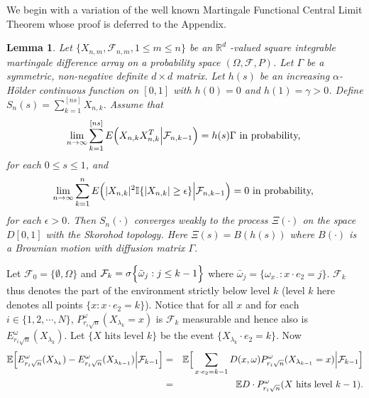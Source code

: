 \documentclass[11pt]{amsart}
\newtheorem{lemma}[theorem]{\sc Lemma}
\begin{document}
We begin with a variation of the well known Martingale Functional Central Limit Theorem whose proof is deferred to the Appendix.
\bigskip
\begin{lemma}
 \label{MCLT}
 Let $ \{X_{n,m}, \mathcal{F}_{n,m}, 1 \leq m \leq n \}$ be an $\mathbb{R}^d$ -valued square integrable martingale difference array on a probability space $(\Omega, \mathcal{F} , P )$. Let $\Gamma$ be a symmetric, non-negative definite $d \times d$ matrix. 
Let $h(s)$ be an increasing $\alpha$-H\"older continuous function on $[0,1]$ with $h(0)=0$ and $h(1)=\gamma >0$.
Define $S_n(s)= \sum_{k=1}^{[ns]}X_{n,k} $. 
Assume that
\begin{eqnarray}
\label{cond1}
\lim \limits_{n \to \infty} \sum_{k=1} ^ {[ns]} E\Big{(}X_{n,k} X_{n,k}^T \Big{\vert} \mathcal{F}_{n,k-1}\Big{)} =   h(s) \Gamma \mbox{   in probability,  } 
\end{eqnarray}
for each $0 \leq s \leq 1$, and 
\begin{eqnarray}
\label{cond2}
\lim \limits_{ n \to \infty} \sum_{k=1}^{n} E \Big{(} |X_{n,k}|^2 \mathbb{I}\{|X_{n,k}| \geq \epsilon\} \Big{\vert} \mathcal{F}_{n,k-1} \Big{)} = 0  \mbox {   in probability,   }  
\end{eqnarray}
for each $\epsilon  > 0$. Then $S_n(\cdot)$ converges weakly to the process $\Xi(\cdot)$ on the space $D[0,1]$ with the Skorohod topology. Here $\Xi(s)=B(h(s))$ where $B(\cdot)$ is a Brownian motion with diffusion matrix $\Gamma$. 
\end{lemma}
\vspace{0.3cm}
 Let $\mathcal{F}_0=\lbrace \emptyset,\Omega \rbrace$ and $\mathcal{F}_k=\sigma\Big{\{}\bar{\omega}_j : j \le k-1\Big{\}}$ where $\bar{\omega}_j = \lbrace \omega_{x \cdot} : x\cdot e_2=j \rbrace$. $\mathcal{F}_k$ thus denotes the part of the environment strictly below level $k$ (level $k$ here denotes all points $\{x: x\cdot e_2=k\}$). Notice that for all $x$ and for each $i \in \{1,2,\cdots,N\}$, $P_{r_i\sqrt{n}}^{\omega}(X_{\lambda_{k}}=x)$ is $\mathcal{F}_k$ measurable and hence also is $E_{r_i \sqrt{n}}^{\omega}(X_{\lambda_{k}})$. Let $\{X \mbox{ hits level }k \}$ be the event $\{X_{\lambda_k} \cdot e_2=k \}$. Now
\begin{eqnarray*}
 \mathbb{E}\Big{[} E_{r_i\sqrt{n}}^{\omega}(X_{\lambda_k})-E_{r_i\sqrt{n}}^{\omega}(X_{\lambda_{k-1}})
   \Big{\vert} \mathcal{F}_{k-1} \Big{]}
&=&\mathbb{E} \Big{[} \sum_{x \cdot e_2 =k-1}D(x,\omega) P_{r_i\sqrt{n}}^{\omega}(X_{\lambda_{k-1}}=x) \Big{\vert} \mathcal{F}_{k-1} \Big{]}\\
&=&\mathbb{E}D \cdot P_{r_i\sqrt{n}}^{\omega}(X \mbox{ hits level } k-1).  
\end{eqnarray*}
\end{document}
